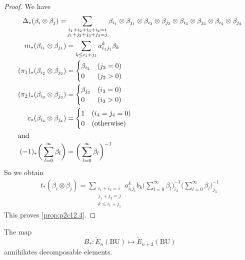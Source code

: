 \documentclass[../main]{subfiles}
\begin{document}
\begin{proof}
We have
\begin{align*}
\Delta_\ast(\beta_i\otimes\beta_j) = &\sum_{\substack{i_1+i_2+i_3+i_4=i\\ j_1+j_2+j_3+j_4=j}} \beta_{i_1}\otimes\beta_{j_1}\otimes\beta_{i_2}\otimes\beta_{j_2}\otimes\beta_{i_3}\otimes\beta_{j_3}\otimes\beta_{i_4}\otimes\beta_{j_4}\\
m_\ast(\beta_{i_1}\otimes\beta_{j_1})&= \sum_{k\le i_1+j_1}a^k_{{i_1}{j_1}}\beta_k\\
(\pi_1)_\ast(\beta_{i_2}\otimes\beta_{j_2}) &= \begin{cases}\beta_{i_2}&(j_2=0)\\0&(j_2>0)\end{cases}\\
(\pi_2)_\ast(\beta_{i_3}\otimes\beta_{j_3}) &= \begin{cases}\beta_{j_3}&(i_3=0)\\0&(i_3>0)\end{cases}\\
c_\ast(\beta_{i_4}\otimes\beta_{j_4}) &= \begin{cases}1 & (i_4=j_4=0)\\0&(\text{otherwise})\end{cases}\\
\intertext{and}
(-1)_\ast\bigg(\sum^\infty_{l=0} \beta_l\bigg) &= \bigg(\sum^\infty_{l=0} \beta_l\bigg)^{-1}
\end{align*}
So we obtain
\begin{align*}
t_\ast(\beta_{i}\otimes\beta_{j}) = \sum_{\substack{i_1+i_2=i\\ j_1+j_3=j\\k\le i_1+j_1}} a^k_{{i_1}{j_1}} b_k \bigg(\sum^\infty_{l=0}\beta_l\bigg)_{i_2}^{-1} \bigg(\sum^\infty_{l=0} \beta_l\bigg)^{-1}_{j_3}
\end{align*}
This proves \eqref{prop:p2c12.4}.
\end{proof}
\begin{customprop}{12.5}
\label{prop:p2c12.5}
The map \[B_\ast:\widetilde{E}_n(\mathrm{BU}) \mapsto \widetilde{E}_{n+2}(\mathrm{BU})\] annihilates decomposable elements. 
\end{customprop}
\end{document}
